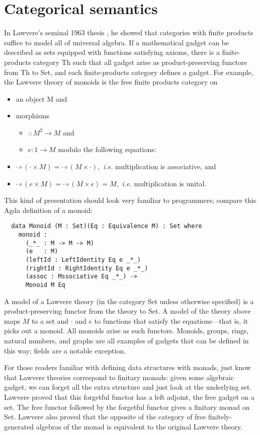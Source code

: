 \documentclass[a4paper,UKenglish]{article}
\newcommand{\maps}{\colon}
\begin{document}
\section{Categorical semantics}

In Lawvere's seminal 1963 thesis \cite{Lawvere}, he showed that categories with finite products suffice to model all of universal algebra.  If a mathematical gadget can be described as sets equipped with functions satisfying axioms, there is a finite-products category Th such that all gadget arise as product-preserving functors from Th to Set, and each finite-products category defines a gadget.  For example, the Lawvere theory of monoids is the free finite products category on
\begin{itemize}
  \item an object M and
  \item morphisms 
  \begin{itemize}
    \item $\cdot\maps M^2 \to M$ and
    \item $e\maps 1 \to M$ modulo the following equations:
  \end{itemize}
  \item $\cdot \circ (\cdot \times M) = \cdot \circ (M \times \cdot),$ {\em i.e.} multiplication is associative, and
  \item $\cdot \circ (e \times M) = \cdot \circ (M \times e) = M,$ {\em i.e.} multiplication is unital.
\end{itemize}
This kind of presentation should look very familiar to programmers; compare this Agda definition of a monoid:
\begin{verbatim}
  data Monoid (M : Set)(Eq : Equivalence M) : Set where
    monoid :
      (_*_ : M -> M -> M)
      (e   : M)
      (leftId : LeftIdentity Eq e _*_)
      (rightId : RightIdentity Eq e _*_)
      (assoc : Mssociative Eq _*_) ->
      Monoid M Eq
\end{verbatim}

A model of a Lawvere theory (in the category Set unless otherwise specified) is a product-preserving functor from the theory to Set.  A model of the theory above maps $M$ to a set and $\cdot$ and $e$ to functions that satisfy the equations---that is, it picks out a monoid.  All monoids arise as such functors. Monoids, groups, rings, natural numbers, and graphs are all examples of gadgets that can be defined in this way; fields are a notable exception.  

For those readers familiar with defining data structures with monads, just know that Lawvere theories correspond to finitary monads: given some algebraic gadget, we can forget all the extra structure and just look at the underlying set.  Lawvere proved that this forgetful functor has a left adjoint, the free gadget on a set.  The free functor followed by the forgetful functor gives a finitary monad on Set.  Lawvere also proved that the opposite of the category of free finitely-generated algebras of the monad is equivalent to the original Lawvere theory.
\end{document}
